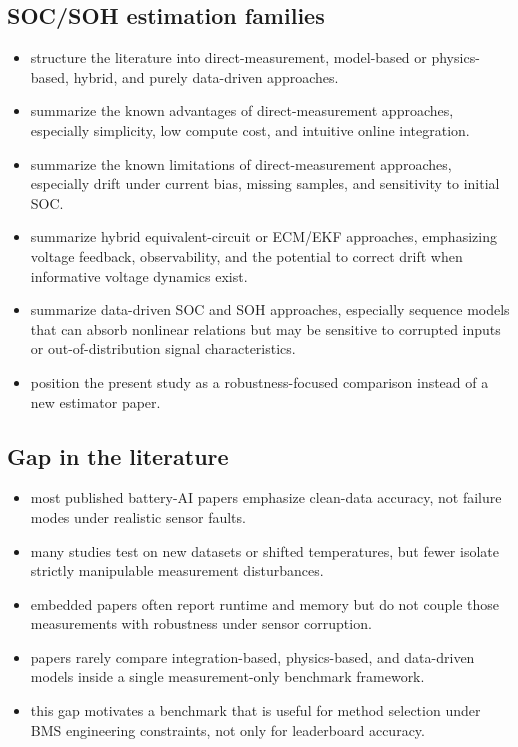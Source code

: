 \documentclass[review,nopreprintline]{elsarticle}
\begin{document}
\subsection{SOC/SOH estimation families}
\begin{itemize}[leftmargin=*]
    \item structure the literature into direct-measurement, model-based or physics-based, hybrid, and purely data-driven approaches.
    \item summarize the known advantages of direct-measurement approaches, especially simplicity, low compute cost, and intuitive online integration.
    \item summarize the known limitations of direct-measurement approaches, especially drift under current bias, missing samples, and sensitivity to initial SOC.
    \item summarize hybrid equivalent-circuit or ECM/EKF approaches, emphasizing voltage feedback, observability, and the potential to correct drift when informative voltage dynamics exist.
    \item summarize data-driven SOC and SOH approaches, especially sequence models that can absorb nonlinear relations but may be sensitive to corrupted inputs or out-of-distribution signal characteristics.
    \item position the present study as a robustness-focused comparison instead of a new estimator paper.
\end{itemize}

\subsection{Gap in the literature}
\begin{itemize}[leftmargin=*]
    \item most published battery-AI papers emphasize clean-data accuracy, not failure modes under realistic sensor faults.
    \item many studies test on new datasets or shifted temperatures, but fewer isolate strictly manipulable measurement disturbances.
    \item embedded papers often report runtime and memory but do not couple those measurements with robustness under sensor corruption.
    \item papers rarely compare integration-based, physics-based, and data-driven models inside a single measurement-only benchmark framework.
    \item this gap motivates a benchmark that is useful for method selection under BMS engineering constraints, not only for leaderboard accuracy.
\end{itemize}
\end{document}
